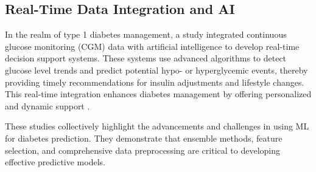 \subsection{Real-Time Data Integration and AI}
In the realm of type 1 diabetes management, a study integrated continuous glucose monitoring (CGM) data with artificial intelligence to develop real-time decision support systems. These systems use advanced algorithms to detect glucose level trends and predict potential hypo- or hyperglycemic events, thereby providing timely recommendations for insulin adjustments and lifestyle changes. This real-time integration enhances diabetes management by offering personalized and dynamic support \cite{Ref18}.

These studies collectively highlight the advancements and challenges in using ML for diabetes prediction. They demonstrate that ensemble methods, feature selection, and comprehensive data preprocessing are critical to developing effective predictive models. 

